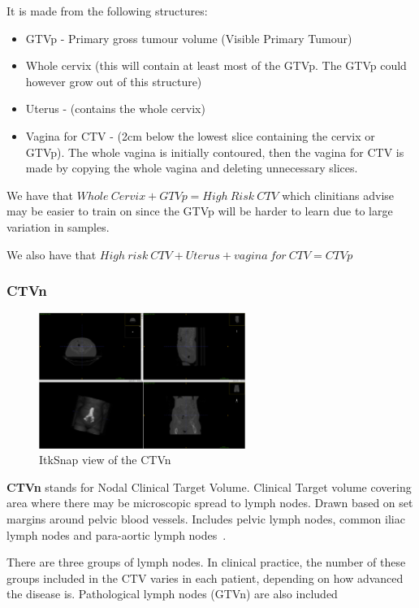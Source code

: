 \documentclass[11pt]{article}
\begin{document}
It is made from the following structures:

\begin{itemize}
    \item GTVp - Primary gross tumour volume (Visible Primary Tumour)
    \item Whole cervix (this will contain at least most of the GTVp. The GTVp could however grow out of this structure)
    \item Uterus - (contains the whole cervix)
    \item Vagina for CTV - (2cm below the lowest slice containing the cervix or GTVp). The whole vagina is initially contoured, then the vagina for CTV is made by copying the whole vagina and deleting unnecessary slices. 
\end{itemize}

We have that $Whole\ Cervix + GTVp = High\ Risk\ CTV$ which clinitians advise may be easier to train on since the GTVp will be harder to learn due to large variation in samples.

We also have that $High\ risk\ CTV + Uterus + vagina\ for\ CTV = CTVp$

\subsubsection{CTVn}

\begin{figure}[H]
    \centering
    \includegraphics[width=0.6\textwidth]{images/CTVn.png}
    \caption{ItkSnap view of the CTVn}\label{fig:CTVn}
\end{figure}

\textbf{CTVn} stands for Nodal Clinical Target Volume. Clinical Target volume covering area where there may be microscopic spread to lymph nodes. Drawn based on set margins around pelvic blood vessels. Includes pelvic lymph nodes, common iliac lymph nodes and para-aortic lymph nodes~\cite{AMLART-data}.

There are three groups of lymph nodes. In clinical practice, the number of these groups included in the CTV varies in each patient, depending on how advanced the disease is. Pathological lymph nodes (GTVn) are also included
\end{document}
